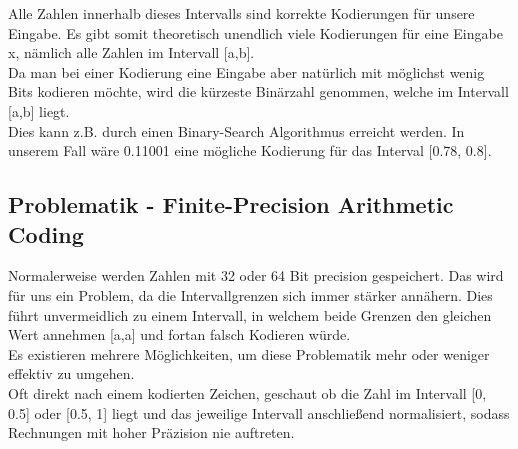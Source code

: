\documentclass[a4paper]{article}
\theoremstyle{definition}
\theoremstyle{remark}
\begin{document}
Alle Zahlen innerhalb dieses Intervalls sind korrekte Kodierungen für unsere Eingabe. Es gibt somit theoretisch unendlich viele Kodierungen für eine Eingabe x, nämlich alle Zahlen im Intervall [a,b].\\
Da man bei einer Kodierung eine Eingabe aber natürlich mit möglichst wenig Bits kodieren möchte, wird die kürzeste Binärzahl genommen, welche im Intervall [a,b] liegt.\\
Dies kann z.B. durch einen Binary-Search Algorithmus erreicht werden. In unserem Fall wäre 0.11001 eine mögliche Kodierung für das Interval [0.78, 0.8].

\subsection{Problematik - Finite-Precision Arithmetic Coding}
\label{sec:Problematik}
Normalerweise werden Zahlen mit 32 oder 64 Bit precision gespeichert. Das wird für uns ein Problem, da die Intervallgrenzen sich immer stärker annähern. Dies führt unvermeidlich zu einem Intervall, in welchem beide Grenzen den gleichen Wert annehmen [a,a] und  fortan falsch Kodieren würde.\\
Es existieren mehrere Möglichkeiten, um diese Problematik mehr oder weniger effektiv zu umgehen.\\
Oft direkt nach einem kodierten Zeichen, geschaut ob die Zahl im Intervall [0, 0.5] oder [0.5, 1] liegt und das jeweilige Intervall anschließend normalisiert, sodass Rechnungen mit hoher Präzision nie auftreten.

\newpage
\end{document}
